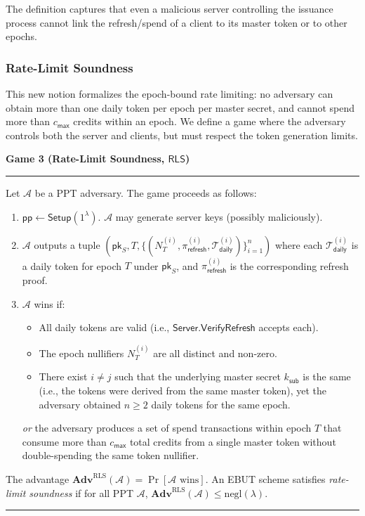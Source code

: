 \documentclass[11pt]{article}
\theoremstyle{definitionstyle}
\theoremstyle{plain}
\newenvironment{game}[2][]
  {\par\addvspace{\topsep}\noindent\textbf{Game #2}\ #1\par\nobreak\smallskip\hrule\smallskip}
  {\hrule\par\addvspace{\topsep}}
\newcommand{\advantage}[1]{\mathbf{Adv}^{\mathrm{#1}}}
\newcommand{\negl}{\mathrm{negl}}
\begin{document}
\noindent The definition captures that even a malicious server controlling the issuance process cannot link the refresh/spend of a client to its master token or to other epochs.

\subsubsection{Rate-Limit Soundness}
This new notion formalizes the epoch-bound rate limiting: no adversary can obtain more than one daily token per epoch per master secret, and cannot spend more than $c_{\mathsf{max}}$ credits within an epoch. We define a game where the adversary controls both the server and clients, but must respect the token generation limits.

\begin{game}{3 (Rate-Limit Soundness, $\mathsf{RLS}$)}
Let $\mathcal{A}$ be a PPT adversary. The game proceeds as follows:
\begin{enumerate}[leftmargin=*]
\item $\mathsf{pp} \leftarrow \mathsf{Setup}(1^\lambda)$. $\mathcal{A}$ may generate server keys (possibly maliciously).
\item $\mathcal{A}$ outputs a tuple $(\mathsf{pk}_S, T, \{(N_T^{(i)}, \pi_{\mathsf{refresh}}^{(i)}, \mathcal{T}_{\mathsf{daily}}^{(i)})\}_{i=1}^n)$ where each $\mathcal{T}_{\mathsf{daily}}^{(i)}$ is a daily token for epoch $T$ under $\mathsf{pk}_S$, and $\pi_{\mathsf{refresh}}^{(i)}$ is the corresponding refresh proof.
\item $\mathcal{A}$ wins if:
  \begin{itemize}
  \item All daily tokens are valid (i.e., $\mathsf{Server.VerifyRefresh}$ accepts each).
  \item The epoch nullifiers $N_T^{(i)}$ are all distinct and non-zero.
  \item There exist $i \neq j$ such that the underlying master secret $k_{\mathsf{sub}}$ is the same (i.e., the tokens were derived from the same master token), yet the adversary obtained $n \ge 2$ daily tokens for the same epoch.
  \end{itemize}
  \emph{or} the adversary produces a set of spend transactions within epoch $T$ that consume more than $c_{\mathsf{max}}$ total credits from a single master token without double-spending the same token nullifier.
\end{enumerate}
The advantage $\advantage{RLS}(\mathcal{A}) = \Pr[\mathcal{A} \text{ wins}]$. An EBUT scheme satisfies \emph{rate-limit soundness} if for all PPT $\mathcal{A}$, $\advantage{RLS}(\mathcal{A}) \le \negl(\lambda)$.
\end{game}
\end{document}
